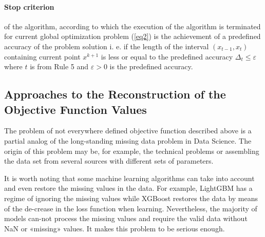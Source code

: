 \documentclass[runningheads]{llncs}
\begin{document}
\paragraph{Stop criterion} of the algorithm, according to which the execution of the algorithm is terminated for current global optimization problem (\ref{eq2}) is the achievement of a predefined accuracy of the problem solution i. e. if the length of the interval $(x_{t-1},x_t)$ containing current point $x^{k+1}$ is less or equal to the predefined accuracy $\Delta _t \leq \varepsilon$ where $t$ is from Rule 5 and $\varepsilon >0$ is the predefined accuracy.

\subsection{ Approaches to the Reconstruction of the Objective Function Values }
The problem of not everywhere defined objective function described above is a partial analog of the long-standing missing data problem in Data Science. The origin of this problem may be, for example, the technical problems or assembling the data set from several sources with different sets of parameters.

It is worth noting that some machine learning algorithms can take into account and even restore the missing values in the data. For example, LightGBM has a regime of ignoring the missing values while XGBoost restores the data by means of the de-crease in the loss function when learning. Nevertheless, the majority of models can-not process the missing values and require the valid data without NaN or «missing» values. It makes this problem to be serious enough.
\end{document}

